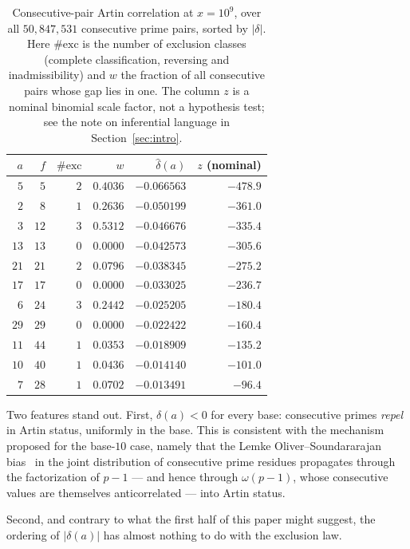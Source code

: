 \documentclass[11pt,reqno]{amsart}
\theoremstyle{plain}
\theoremstyle{definition}
\begin{document}
\begin{table}[t]
\centering
\caption{Consecutive-pair Artin correlation at $x = 10^9$, over all
$50{,}847{,}531$ consecutive prime pairs, sorted by $|\delta|$. Here
$\#\mathrm{exc}$ is the number of exclusion classes (complete classification,
reversing and inadmissibility) and $w$ the fraction of all consecutive pairs
whose gap lies in one. The column $z$ is a nominal binomial scale factor, not
a hypothesis test; see the note on inferential language in
Section~\ref{sec:intro}.}
\label{tab:delta}
\begin{tabular}{rrrrrr}
\toprule
$a$ & $f$ & $\#\mathrm{exc}$ & $w$ & $\widehat{\delta}(a)$ & $z$ (nominal) \\
\midrule
$5$  & $5$  & $2$ & $0.4036$ & $-0.066563$ & $-478.9$ \\
$2$  & $8$  & $1$ & $0.2636$ & $-0.050199$ & $-361.0$ \\
$3$  & $12$ & $3$ & $0.5312$ & $-0.046676$ & $-335.4$ \\
$13$ & $13$ & $0$ & $0.0000$ & $-0.042573$ & $-305.6$ \\
$21$ & $21$ & $2$ & $0.0796$ & $-0.038345$ & $-275.2$ \\
$17$ & $17$ & $0$ & $0.0000$ & $-0.033025$ & $-236.7$ \\
$6$  & $24$ & $3$ & $0.2442$ & $-0.025205$ & $-180.4$ \\
$29$ & $29$ & $0$ & $0.0000$ & $-0.022422$ & $-160.4$ \\
$11$ & $44$ & $1$ & $0.0353$ & $-0.018909$ & $-135.2$ \\
$10$ & $40$ & $1$ & $0.0436$ & $-0.014140$ & $-101.0$ \\
$7$  & $28$ & $1$ & $0.0702$ & $-0.013491$ & $-96.4$ \\
\bottomrule
\end{tabular}
\end{table}

Two features stand out. First, $\delta(a) < 0$ for every base: consecutive
primes \emph{repel} in Artin status, uniformly in the base. This is consistent
with the mechanism proposed for the base-$10$ case, namely that the
Lemke Oliver--Soundararajan bias~\cite{LOS2016} in the joint distribution of
consecutive prime residues propagates through the factorization of $p-1$ ---
and hence through $\omega(p-1)$, whose consecutive values are themselves
anticorrelated --- into Artin status.

Second, and contrary to what the first half of this paper might suggest, the
ordering of $|\delta(a)|$ has almost nothing to do with the exclusion law.
\end{document}
